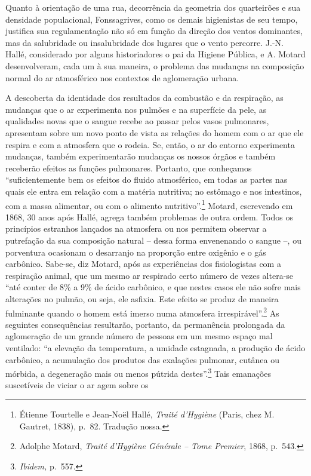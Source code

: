 Quanto à orientação de uma rua, decorrência da geometria dos quarteirões
e sua densidade populacional, Fonssagrives, como os demais higienistas
de seu tempo, justifica sua regulamentação não só em função da direção
dos ventos dominantes, mas da salubridade ou insalubridade dos lugares
que o vento percorre. J.-N. Hallé, considerado por alguns historiadores
o pai da Higiene Pública, e A. Motard desenvolveram, cada um à sua
maneira, o problema das mudanças na composição normal do ar atmosférico
nos contextos de aglomeração urbana.

A descoberta da identidade dos resultados da combustão e da respiração,
as mudanças que o ar experimenta nos pulmões e na superfície da pele, as
qualidades novas que o sangue recebe ao passar pelos vasos pulmonares,
apresentam sobre um novo ponto de vista as relações do homem com o ar
que ele respira e com a atmosfera que o rodeia. Se, então, o ar do
entorno experimenta mudanças, também experimentarão mudanças os nossos
órgãos e também receberão efeitos as funções pulmonares. Portanto, que
conheçamos ``suficientemente bem os efeitos do fluido atmosférico, em
todas as partes nas quais ele entra em relação com a matéria nutritiva;
no estômago e nos intestinos, com a massa alimentar, ou com o alimento
nutritivo''.\footnote{Étienne Tourtelle e Jean-Noël Hallé, \emph{Traité
  d'Hygiène} (Paris, chez M. Gautret, 1838), p.~82. Tradução nossa.}
Motard, escrevendo em 1868, 30 anos após Hallé, agrega também problemas
de outra ordem. Todos os princípios estranhos lançados na atmosfera ou
nos permitem observar a putrefação da sua composição natural -- dessa
forma envenenando o sangue --, ou porventura ocasionam o desarranjo na
proporção entre oxigênio e o gás carbônico. Sabe-se, diz Motard, após as
experiências dos fisiologistas com a respiração animal, que um mesmo ar
respirado certo número de vezes altera-se ``até conter de 8\% a 9\% de
ácido carbônico, e que nestes casos ele não sofre mais alterações no
pulmão, ou seja, ele asfixia. Este efeito se produz de maneira
fulminante quando o homem está imerso numa atmosfera
irrespirável''.\footnote{Adolphe Motard, \emph{Traité d'Hygiène Générale
  -- Tome Premier}, 1868, p.~543.} As seguintes consequências
resultarão, portanto, da permanência prolongada da aglomeração de um
grande número de pessoas em um mesmo espaço mal ventilado: ``a elevação
da temperatura, a umidade estagnada, a produção de ácido carbônico, a
acumulação dos produtos das exalações pulmonar, cutânea ou mórbida, a
degeneração mais ou menos pútrida destes''.\footnote{\emph{Ibidem,}
  p.~557.} Tais emanações suscetíveis de viciar o ar agem sobre os
